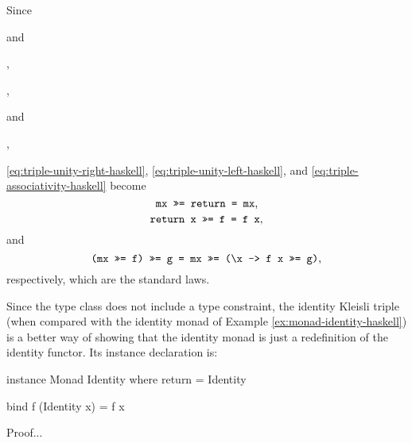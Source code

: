 Since
\begin{steps}
\end{steps}
and
\begin{steps}
  ,
\end{steps}
\begin{steps}
  ,
\end{steps}
and
\begin{steps}
    \eqbydef{\texthaskell{(>>=)} \eqref{eq:triple-to-alternative-bind-haskell}}
  ,
\end{steps}
\eqref{eq:triple-unity-right-haskell}, \eqref{eq:triple-unity-left-haskell},
and \eqref{eq:triple-associativity-haskell} become
\begin{equation*}
  \text{\texttt{mx >>= return = mx}}
  \text{,}
\end{equation*}
\begin{equation*}
  \text{\texttt{return x >>= f = f x}}
  \text{,}
\end{equation*}
and
\begin{equation*}
  \text{\texttt{(mx >>= f) >>= g = mx >>= (\textbackslash x -> f x >>= g)}}
  \text{,}
\end{equation*}
respectively, which are the standard laws.



\begin{example}
  \label{ex:triple-identity-haskell}

  Since the  type class does not include a
   type constraint, the identity Kleisli triple
  (when compared with the identity monad of Example
  \ref{ex:monad-identity-haskell}) is a better way of showing that the
  identity monad is just a redefinition of the identity functor. Its
  instance declaration is:
  \begin{codehaskell}
instance Monad Identity where
  return = Identity

  bind f (Identity x) = f x
  \end{codehaskell}

  Proof...

\end{example}

